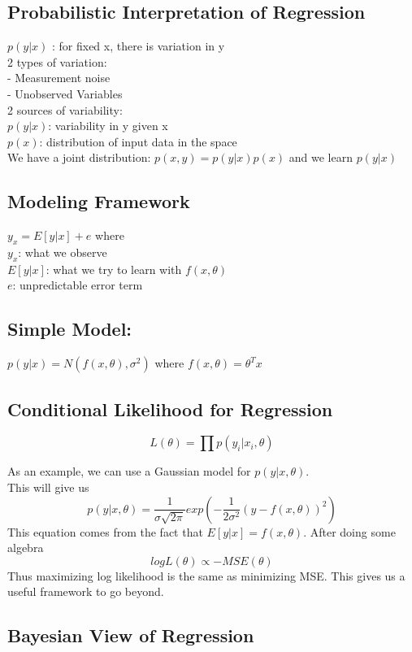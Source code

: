 \documentclass[11pt,psfig]{article}
\begin{document}
\subsection*{Probabilistic Interpretation of Regression}
$p(y|x)$ : for fixed x, there is variation in y\\
2 types of variation:\\
     - Measurement noise\\
     - Unobserved Variables\\
2 sources of variability:\\
     $p(y|x)$: variability in y given x\\
     $p(x)$: distribution of input data in the space\\
We have a joint distribution: $p(x,y) = p(y|x)p(x)$ and we learn $p(y|x)$

\subsection*{Modeling Framework}
$y_x = E[y|x] + e$ where \\
     $y_x$: what we observe\\
     $E[y|x]$: what we try to learn with $f(x,\theta)$\\
     $e$: unpredictable error term

\subsection*{Simple Model:}
     $p(y|x) = N( f(x,\theta), \sigma^2)$ where $f(x,\theta) = \theta^Tx$

\subsection*{Conditional Likelihood for Regression}
\[
L(\theta) = \prod{p(y_i|x_i,\theta)}
\]

As an example, we can use a Gaussian model for $p(y|x,\theta)$.\\
This will give us
\[
p(y|x,\theta) = \frac{1}{\sigma\sqrt{2\pi}} exp(-\frac{1}{2\sigma^2}(y-f(x,\theta))^2)
\]
This equation comes from the fact that $E[y|x] = f(x,\theta)$. 
After doing some algebra
\[
log L(\theta) \propto -MSE(\theta)
\]
Thus maximizing log likelihood is the same as minimizing MSE. This gives us a useful framework to go beyond. 

\subsection*{Bayesian View of Regression}
\end{document}
